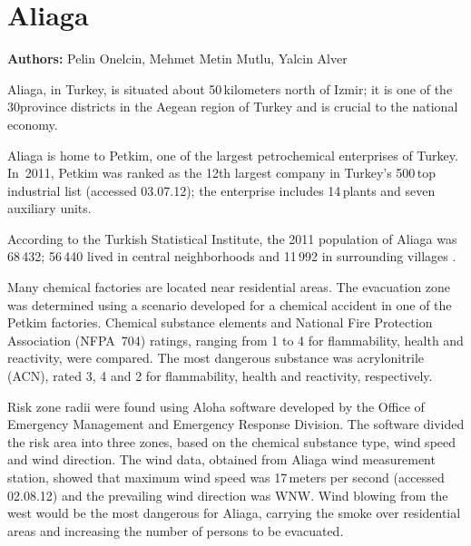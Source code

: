 \chapter{Aliaga}
\label{ch:aliaga}
\hfill \textbf{Authors:} Pelin Onelcin, Mehmet Metin Mutlu, Yalcin Alver


Aliaga, in Turkey, is situated about 50\,kilometers north of Izmir; it is one of the 30\Izmir province districts in the Aegean region of Turkey and is crucial to the national economy. 
 
Aliaga is home to Petkim, one of the largest petrochemical enterprises of Turkey.
In~2011, Petkim was ranked as the 12th largest company in Turkey's 500\,top industrial list \citep[][]{ICI_Webpage_2012}(accessed 03.07.12); the enterprise includes 14\,plants and seven auxiliary units. 

According to the Turkish Statistical Institute, the 2011 population of Aliaga was 68\,432; 56\,440 lived in central neighborhoods and 11\,992 in surrounding villages \citep[][]{TSI_Webpage_2011}.

Many chemical factories are located near residential areas. The evacuation zone was determined using a scenario developed for a chemical accident in one of the Petkim factories. Chemical substance elements and  National Fire Protection Association (NFPA~704) ratings, ranging from 1 to 4 for flammability, health and reactivity, were compared. The most dangerous substance was acrylonitrile (ACN), rated 3, 4 and 2 for flammability, health and reactivity, respectively.

Risk zone radii were found using Aloha software developed by the Office of Emergency Management and Emergency Response Division. The software divided the risk area into three zones, based on the chemical substance type, wind speed and wind direction. The wind data, obtained from Aliaga wind measurement station, showed that maximum wind speed was 17\,meters per second \citep[][]{Wolfram_Webpage_2012}(accessed 02.08.12) and the prevailing wind direction was WNW. Wind blowing from the west would be the most dangerous for Aliaga, carrying the smoke over residential areas and increasing the number of persons to be evacuated.

